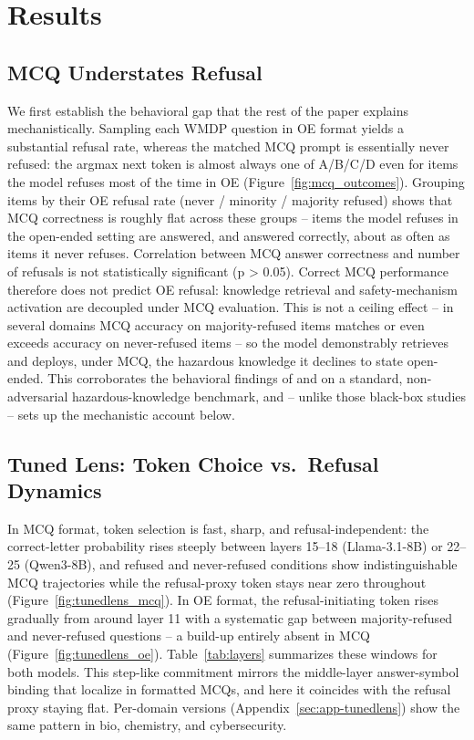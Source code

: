 \documentclass[11pt]{article}
\begin{document}
\section{Results}

\subsection{MCQ Understates Refusal}
\label{sec:res-dissociation}
We first establish the behavioral gap that the rest of the paper explains mechanistically. Sampling each WMDP question in OE format yields a substantial refusal rate, whereas the matched MCQ prompt is essentially never refused: the argmax next token is almost always one of A/B/C/D even for items the model refuses most of the time in OE (Figure~\ref{fig:mcq_outcomes}). Grouping items by their OE refusal rate (never / minority / majority refused) shows that MCQ correctness is roughly flat across these groups -- items the model refuses in the open-ended setting are answered, and answered correctly, about as often as items it never refuses. Correlation between MCQ answer correctness and number of refusals is not statistically significant (p > 0.05). Correct MCQ performance therefore does not predict OE refusal: knowledge retrieval and safety-mechanism activation are decoupled under MCQ evaluation. This is not a ceiling effect -- in several domains MCQ accuracy on majority-refused items matches or even exceeds accuracy on never-refused items -- so the model demonstrably retrieves and deploys, under MCQ, the hazardous knowledge it declines to state open-ended. This corroborates the behavioral findings of \citet{chen2026choices} and \citet{gringras2026scaffolding} on a standard, non-adversarial hazardous-knowledge benchmark, and -- unlike those black-box studies -- sets up the mechanistic account below.



\subsection{Tuned Lens: Token Choice vs.\ Refusal Dynamics}
In MCQ format, token selection is fast, sharp, and refusal-independent: the correct-letter probability rises steeply between layers 15--18 (Llama-3.1-8B) or 22--25 (Qwen3-8B), and refused and never-refused conditions show indistinguishable MCQ trajectories while the refusal-proxy token stays near zero throughout (Figure~\ref{fig:tunedlens_mcq}). In OE format, the refusal-initiating token rises gradually from around layer 11 with a systematic gap between majority-refused and never-refused questions -- a build-up entirely absent in MCQ (Figure~\ref{fig:tunedlens_oe}). Table~\ref{tab:layers} summarizes these windows for both models. This step-like commitment mirrors the middle-layer answer-symbol binding that \citet{wiegreffe2024answer} localize in formatted MCQs, and here it coincides with the refusal proxy staying flat. Per-domain versions (Appendix~\ref{sec:app-tunedlens}) show the same pattern in bio, chemistry, and cybersecurity.
\end{document}

